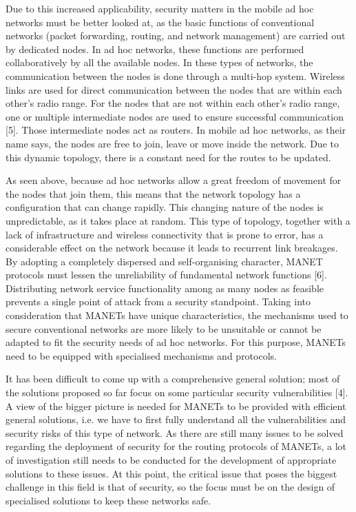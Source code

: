 \documentclass{default}
\begin{document}
Due to this increased applicability, security matters in the mobile ad hoc networks must be better looked at, as the basic functions of conventional networks (packet forwarding, routing, and network management) are carried out by dedicated nodes. In ad hoc networks, these functions are performed collaboratively by all the available nodes. In these types of networks, the communication between the nodes is done through a multi-hop system. Wireless links are used for direct communication between the nodes that are within each other’s radio range. For the nodes that are not within each other’s radio range, one or multiple intermediate nodes are used to ensure successful communication [5]. Those intermediate nodes act as routers. In mobile ad hoc networks, as their name says, the nodes are free to join, leave or move inside the network. Due to this dynamic topology, there is a constant need for the routes to be updated.

As seen above, because ad hoc networks allow a great freedom of movement for the nodes that join them, this means that the network topology has a configuration that can change rapidly. This changing nature of the nodes is unpredictable, as it takes place at random. This type of topology, together with a lack of infrastructure and wireless connectivity that is prone to error, has a considerable effect on the network because it leads to recurrent link breakages. By adopting a completely dispersed and self-organising character, MANET protocols must lessen the unreliability of fundamental network functions [6]. Distributing network service functionality among as many nodes as feasible prevents a single point of attack from a security standpoint. Taking into consideration that MANETs have unique characteristics, the mechanisms used to secure conventional networks are more likely to be unsuitable or cannot be adapted to fit the security needs of ad hoc networks. For this purpose, MANETs need to be equipped with specialised mechanisms and protocols.

It has been difficult to come up with a comprehensive general solution; most of the solutions proposed so far focus on some particular security vulnerabilities [4]. A view of the bigger picture is needed for MANETs to be provided with efficient general solutions, i.e. we have to first fully understand all the vulnerabilities and security risks of this type of network. As there are still many issues to be solved regarding the deployment of security for the routing protocols of MANETs, a lot of investigation still needs to be conducted for the development of appropriate solutions to these issues. At this point, the critical issue that poses the biggest challenge in this field is that of security, so the focus must be on the design of specialised solutions to keep these networks safe.
\end{document}
